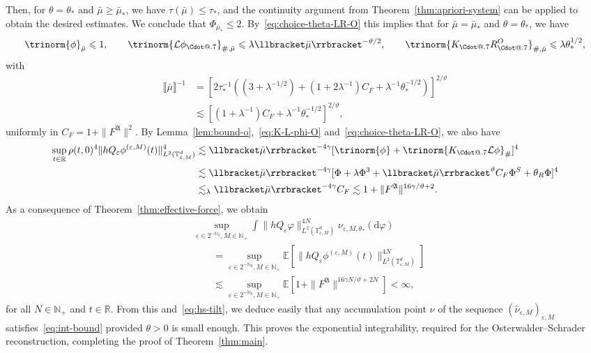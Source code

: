 \documentclass{article}
\makeatletter
\numberwithin{equation}{section}
\newcommand{\mathd}{\mathrm{d}}
\newcommand*\Cdot{{\mathpalette\Cdot@{.7}}}
\newcommand*\Cdot@[2]{\mathbin{\vcenter{\hbox{\scalebox{#2}{\hspace{0.1mm}$\m@th#1\bullet$\hspace{0.1mm}}}}}}
\theoremstyle{plain}
\theoremstyle{definition}
\makeatother
\begin{document}
Then, for $\theta = \theta_{\ast}$ and $\bar{\mu} \geqslant
\bar{\mu}_{\ast}$, we have $\tau (\bar{\mu}) \leqslant \tau_{\ast}$,
and the continuity argument from Theorem~\ref{thm:apriori-system} can be
applied to obtain the desired estimates. We conclude that
$\Phi_{\bar{\mu}_{\ast}} \leqslant 2$. By~\eqref{eq:choice-theta-LR-O} this
implies that for $\bar{\mu} = \bar{\mu}_{\ast}$ and $\theta = \theta_{\ast}$, we have
\[ \trinorm{ \phi }_{\bar{\mu}} \leqslant 1, \qquad \trinorm{
   \mathcal{L} \phi_{\Cdot} }_{\#, \bar{\mu}} \leqslant \lambda
   \llbracket \bar{\mu} \rrbracket^{- \vartheta / 2}, \qquad \trinorm{
   K_{\Cdot} R^O_{\Cdot} }_{\#, \bar{\mu}} \leqslant \lambda
   \theta_{\ast}^{1 / 2}, \]
with
\begin{align*}
   \llbracket \bar{\mu} \rrbracket^{- 1}
   &= [2 \tau_{\ast}^{- 1} ((3 + \lambda^{- 1 / 2})
   + (1 + 2 \lambda^{- 1}) C_F
   + \lambda^{- 1} \theta_{\ast}^{- 1 / 2})]^{2 / \vartheta}\\
   &\lesssim [(1 + \lambda^{- 1}) C_F
   + \lambda^{- 1} \theta_{\ast}^{- 1 / 2}]^{2 / \vartheta},
\end{align*}
uniformly in $C_F = 1 + \| F^{\mathfrak{A}} \|^2$. By
Lemma~\ref{lem:bound-o},~\eqref{eq:K-L-phi-O}
and~\eqref{eq:choice-theta-LR-O}, we also have
\[ \begin{aligned}
     \sup_{t \in \mathbb{R}} \rho (t, 0)^4  \| hQ_{\varepsilon}
     \phi^{(\varepsilon,M)} (t) \|_{L^2 (\mathbb{T}^d_{\varepsilon, M})}^4 &
     \lesssim  \llbracket \bar{\mu} \rrbracket^{- 4 \gamma} [\trinorm{ \phi
     } + \trinorm{ K_{\Cdot} \mathcal{L} \phi
     }_{\#}]^4\\
     & \lesssim  \llbracket \bar{\mu} \rrbracket^{- 4 \gamma} [\Phi +
     \lambda \Phi^3 + \llbracket \bar{\mu} \rrbracket^{\vartheta}
     C_F \Phi^S + \theta_R \Phi]^4\\
     & \lesssim_{\lambda}  \llbracket \bar{\mu} \rrbracket^{- 4 \gamma} C_F
     \lesssim  1 + {\| F^{\mathfrak{A}} \|^{16 \gamma / \vartheta + 2}}  .
   \end{aligned} \]
As a consequence of Theorem~\ref{thm:effective-force}, we obtain
\begin{align*}
  &\sup_{\varepsilon \in 2^{-\mathbb{N}_0}, M \in \mathbb{N}_+}
  \int \| hQ_{\varepsilon} \varphi \|_{L^2 (\mathbb{T}^d_{\varepsilon, M})}^{4
  N} \nu_{\varepsilon, M, \theta_\ast} (\mathd \varphi)\\
  &\qquad =  \sup_{\varepsilon
  \in 2^{-\mathbb{N}_0}, M \in \mathbb{N}_+} \mathbb{E} [\| hQ_{\varepsilon}
  \phi^{(\varepsilon, M)} (t) \|_{L^2 (\mathbb{T}^d_{\varepsilon, M})}^{4
  N}]\\
 &\qquad \lesssim  \sup_{\varepsilon \in 2^{-\mathbb{N}_0}, M \in \mathbb{N}_+}
  \mathbb{E} [1 + \| F^{\mathfrak{A}} \|^{16 \gamma N / \vartheta + 2 N}] <
  \infty,
\end{align*}
for all $N \in \mathbb{N}_+$ and $t \in \mathbb{R}$. From this
and~\eqref{eq:hs-tilt}, we deduce easily that any accumulation point $\nu$ of
the sequence $(\hat{\nu}_{\varepsilon, M})_{\varepsilon, M}$
satisfies~\eqref{eq:int-bound} provided $\theta > 0$ is small enough. This
proves the exponential integrability, required for the Osterwalder--Schrader
reconstruction, completing the proof of Theorem~\ref{thm:main}.
\end{document}
